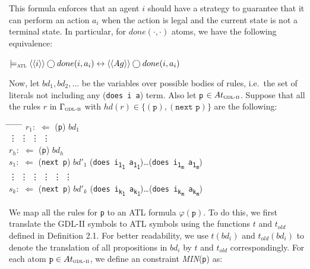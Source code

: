 \documentclass{article}
\theoremstyle{theorem}
\theoremstyle{lemma}
\theoremstyle{definition}
\theoremstyle{remark}
\begin{document}
\par This formula enforces that an agent $i$ should have a strategy to guarantee that it can perform an action $a_i$ when the action is legal and the current state is not a terminal state. In particular, for $done(\cdot,\cdot)$ atoms, we have the following equivalence:
\begin{center}
    $\models_\textsc{atl} \langle \langle i \rangle \rangle \bigcirc done(i,a_i) \leftrightarrow \langle \langle Ag \rangle \rangle \bigcirc done(i,a_i)$
\end{center}
\par Now, let $bd_1, bd_2, \ldots$ be the variables over possible bodies of rules, i.e.\ the set of literals not including any (\texttt{does i a}) term. Also let \texttt{p} $\in At_\textsc{gdl-ii}$. Suppose that all the rules $r$ in $\Gamma_\textsc{gdl-ii}$ with $hd(r) \in \{(\texttt{p}),(\texttt{next p})\}$ are the following:
\begin{tabbing}
    \hspace{2cm} \= \hspace{0.5cm} \= \hspace{0.3cm} \= \hspace{1.8cm} \= \hspace{0.5cm} \= \hspace{0.4cm} \= \kill
    \> $r_1:$ \> $\Leftarrow$ \> (\texttt{p}) \> $bd_1$ \\
    \> \vdots \> \vdots \> \vdots \> \vdots \\
    \> $r_h:$ \> $\Leftarrow$ \> (\texttt{p}) \> $bd_h$ \\
    \> $s_1:$ \> $\Leftarrow$ \> (\texttt{next p}) \> $bd'_1$ \> \> (\texttt{does i\textsubscript{\texttt{1}\textsubscript{\texttt{1}}} a\textsubscript{\texttt{1}\textsubscript{\texttt{1}}}})\ldots (\texttt{does i\textsubscript{\texttt{1}\textsubscript{\texttt{m}}} a\textsubscript{\texttt{1}\textsubscript{\texttt{m}}}}) \\
    \> \vdots \> \vdots \> \vdots \> \vdots \> \vdots \> \vdots \\
    \> $s_k:$ \> $\Leftarrow$ \> (\texttt{next p}) \> $bd'_k$ \> \> (\texttt{does i\textsubscript{\texttt{k}\textsubscript{\texttt{1}}} a\textsubscript{\texttt{k}\textsubscript{\texttt{1}}}})\ldots (\texttt{does i\textsubscript{\texttt{k}\textsubscript{\texttt{m}}} a\textsubscript{\texttt{k}\textsubscript{\texttt{m}}}})
\end{tabbing}
\par We map all the rules for \texttt{p} to an ATL formula $\varphi (\texttt{p})$. To do this, we first translate the GDL-II symbols to ATL symbols using the functions $t$ and $t_{old}$ defined in Definition 2.1. For better readability, we use $t(bd_i)$ and $t_{old}(bd_i)$ to denote the translation of all propositions in $bd_i$ by $t$ and $t_{old}$ correspondingly. For each atom $\texttt{p} \in At_\textsc{gdl-ii}$, we define an constraint \textit{MIN}(\texttt{p}) as:
\end{document}
